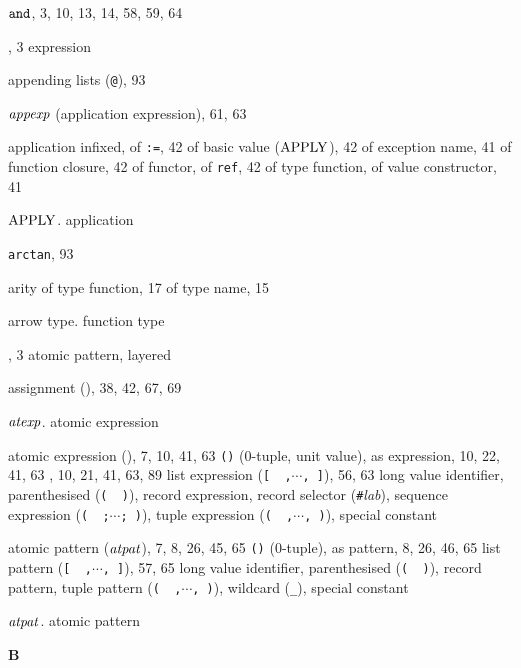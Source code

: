 \begin{theindex}
\item ${\tt and}$, 3, 10, 13, 14, 58, 59, 64 
\item \ANDALSO, 3
\subitem\seealso expression
\item appending lists (\verb+@+), 93
\item ${\it appexp}$ (application expression), 61, 63
\item application
\subitem infixed, \infixapplrefs
\subitem of {\tt :=}, 42
\subitem of basic value (${\rm APPLY}$), 42
\subitem of exception name, 41
\subitem of function closure, 42
\subitem of functor, \funcapprefs
\subitem of {\tt ref}, 42
\subitem of type function, \typefunctionrefs
\subitem of value constructor, 41
\item ${\rm APPLY}$. \see application 
\item {\tt arctan}, 93
\item arity 
\subitem of type function, 17
\subitem of type name, 15
\item arrow type. \see function type
\item \AS, 3
\subitem \seealso atomic pattern, layered
\item assignment (\ml{:=}), 38, 42, 67, 69
\item ${\it atexp}$. \see atomic expression
\item atomic expression (\atexp), 7, 10, 41, 63
\subitem \verb+()+ (0-tuple, unit value), \zeroexptuplerefs
\subitem as expression, 10, 22, 41, 63
\subitem {}, 10, 21, 41, 63, 89
\subitem list expression  (\verb+[  ,+$\cdots$\verb+, ]+), 56, 63
\subitem long value identifier, \vidinatexprefs
\subitem parenthesised (\verb+(  )+), \parexprefs
\subitem record expression, \recordexprefs
\subitem record selector (\verb+#+{\it lab}), \hashrefs
\subitem sequence expression  (\verb+(  ;+$\cdots$\verb+; )+), \sequenceexprefs
\subitem tuple expression (\verb+(  ,+$\cdots$\verb+, )+), \tupleexprefs
\subitem \seealso special constant
\item atomic pattern (${\it atpat}$), 7, 8, 26, 45, 65
\subitem \verb+()+ (0-tuple), \zeropattuplerefs
\subitem as pattern, 8, 26, 46, 65
\subitem list pattern (\verb+[  ,+$\cdots$\verb+, ]+), 57, 65
\subitem long value identifier, \vidinatpatrefs
\subitem parenthesised (\verb+(  )+), \parpatrefs
\subitem record pattern, \recordpatrefs
\subitem tuple pattern (\verb+(  ,+$\cdots$\verb+, )+), \tuplepatrefs
\subitem wildcard (\verb+_+),  \underscorewildrefs
\subitem \seealso special constant
\item ${\it atpat}$. \see atomic pattern
\indexspace
\parbox{65mm}{\hfil{\large\bf B}\hfil}

\end{theindex}
